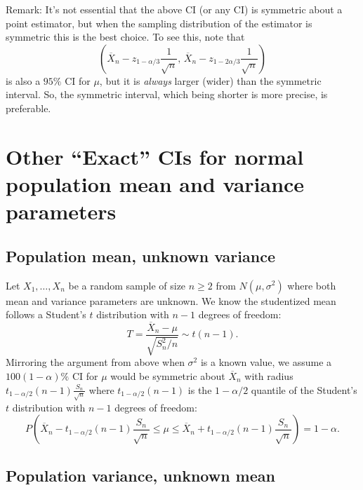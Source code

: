\documentclass[
]{book}
\begin{document}
Remark: It's not essential that the above CI (or any CI) is symmetric about a point estimator, but when the sampling distribution of the estimator is symmetric this is the best choice. To see this, note that
\[\left(\overline X_n - z_{1-\alpha/3}\frac{1}{\sqrt{n}}, \,\overline X_n - z_{1-2\alpha/3}\frac{1}{\sqrt{n}}\right)\]
is also a \(95\%\) CI for \(\mu\), but it is \emph{always} larger (wider) than the symmetric interval. So, the symmetric interval, which being shorter is more precise, is preferable.

\hypertarget{other-exact-cis-for-normal-population-mean-and-variance-parameters}{%
\section{Other ``Exact'' CIs for normal population mean and variance parameters}\label{other-exact-cis-for-normal-population-mean-and-variance-parameters}}

\hypertarget{population-mean-unknown-variance}{%
\subsection{Population mean, unknown variance}\label{population-mean-unknown-variance}}

Let \(X_1, \ldots, X_n\) be a random sample of size \(n\geq 2\) from \(N(\mu, \sigma^2)\) where both mean and variance parameters are unknown. We know the studentized mean follows a Student's \(t\) distribution with \(n-1\) degrees of freedom:
\[T = \frac{\overline X_n - \mu}{\sqrt{S_n^2/n}}\sim t(n-1).\]
Mirroring the argument from above when \(\sigma^2\) is a known value, we assume a \(100(1-\alpha)\%\) CI for \(\mu\) would be symmetric about \(\overline X_n\) with radius \(t_{1-\alpha/2}(n-1) \frac{S_n}{\sqrt{n}}\) where \(t_{1-\alpha/2}(n-1)\) is the \(1-\alpha/2\) quantile of the Student's \(t\) distribution with \(n-1\) degrees of freedom:
\[P\left(\overline X_n - t_{1-\alpha/2}(n-1) \frac{S_n}{\sqrt{n}} \leq \mu \leq \overline X_n + t_{1-\alpha/2}(n-1) \frac{S_n}{\sqrt{n}}\right) = 1-\alpha.\]

\hypertarget{population-variance-unknown-mean}{%
\subsection{Population variance, unknown mean}\label{population-variance-unknown-mean}}
\end{document}
